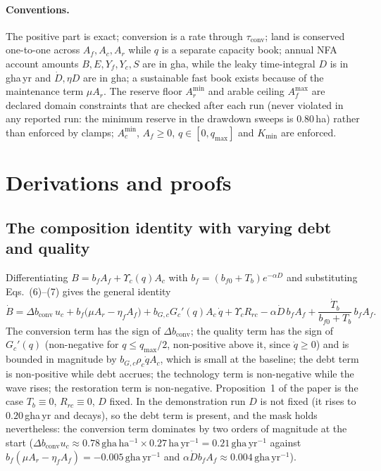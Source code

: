 \documentclass[11pt,a4paper]{article}
\newcommand{\dconv}{\Delta b_{\mathrm{conv}}}
\newcommand{\Ups}{\Upsilon_c}
\newcommand{\Acmin}{A_c^{\min}}
\newcommand{\tconv}{\tau_{\mathrm{conv}}}
\begin{document}
\paragraph{Conventions.} The positive part is exact; conversion is a rate through $\tconv$; land is conserved one-to-one across $A_f,A_c,A_r$ while $q$ is a separate capacity book; annual NFA account amounts $B,E,Y_f,Y_c,S$ are in gha, while the leaky time-integral $D$ is in gha\,yr and $\dot D,\eta D$ are in gha; a sustainable fast book exists because of the maintenance term $\mu A_r$. The reserve floor $A_r^{\min}$ and arable ceiling $A_f^{\max}$ are declared domain constraints that are checked after each run (never violated in any reported run: the minimum reserve in the drawdown sweeps is $0.80$\,ha) rather than enforced by clamps; $\Acmin$, $A_f\ge0$, $q\in[0,q_{\max}]$ and $K_{\min}$ are enforced.

\section{Derivations and proofs}\label{si:proofs}

\subsection{The composition identity with varying debt and quality}\label{si:identity}

Differentiating $B=b_fA_f+\Ups(q)A_c$ with $b_f=(b_{f0}+T_b)e^{-\alpha D}$ and substituting Eqs.~(6)--(7) gives the general identity
\begin{equation}\label{eq:si_identity}
\dot B=\dconv\,u_c+b_f\big(\mu A_r-\eta_fA_f\big)+b_{G,c}G_c'(q)A_c\,\dot q+\Ups R_{rc}-\alpha\dot D\,b_fA_f+\frac{\dot T_b}{b_{f0}+T_b}\,b_fA_f .
\end{equation}
The conversion term has the sign of $\dconv$; the quality term has the sign of $G_c'(q)$ (non-negative for $q\le q_{\max}/2$, non-positive above it, since $\dot q\ge0$) and is bounded in magnitude by $b_{G,c}\rho_c\dot qA_c$, which is small at the baseline; the debt term is non-positive while debt accrues; the technology term is non-negative while the wave rises; the restoration term is non-negative. Proposition~1 of the paper is the case $T_b\equiv0$, $R_{rc}\equiv0$, $D$ fixed. In the demonstration run $D$ is not fixed (it rises to $0.20$\,gha\,yr and decays), so the debt term is present, and the mask holds nevertheless: the conversion term dominates by two orders of magnitude at the start ($\dconv u_c\approx0.78\,\mathrm{gha\,ha^{-1}}\times0.27\,\mathrm{ha\,yr^{-1}}=0.21\,\mathrm{gha\,yr^{-1}}$ against $b_f(\mu A_r-\eta_fA_f)=-0.005\,\mathrm{gha\,yr^{-1}}$ and $\alpha\dot D b_fA_f\approx0.004\,\mathrm{gha\,yr^{-1}}$).
\end{document}
